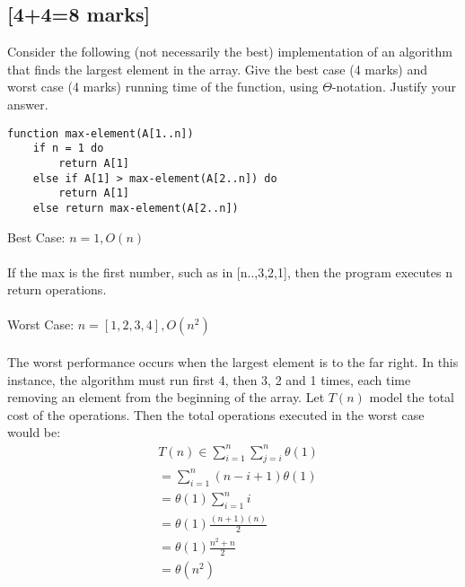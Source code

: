 \documentclass[12pt]{article}
\begin{document}
\subsection{[4+4=8 marks]}
Consider the following (not necessarily the best) implementation of an algorithm that finds the largest element in the array. Give the best case (4 marks)
and worst case (4 marks) running time of the function, using $\Theta$-notation. Justify your answer.
\begin{verbatim}
function max-element(A[1..n])
    if n = 1 do
        return A[1]
    else if A[1] > max-element(A[2..n]) do
        return A[1]
    else return max-element(A[2..n])
\end{verbatim}
Best Case:
$n = 1, O(n)$
\\
\\If the max is the first number, such as in [n..,3,2,1], then the program executes n return operations. 
\\
\\
Worst Case:
$n = [1,2,3,4], O(n^2)$
\\
\\The worst performance occurs when the largest element is to the far right. In this instance, the algorithm must run first 4, then 3, 2 and 1 times, each time removing an element from the beginning of the array. Let $T(n)$ model the total cost of the operations. Then the total operations executed in the worst case would be:\\
\begin{align*}
&T(n) \in \sum_{i=1}^n \sum_{j=i}^n \theta(1)\\
&= \sum_{i=1}^n (n-i+1)\theta(1)\\
&=\theta(1)\sum_{i=1}^n i\\
&=\theta(1)\frac{(n+1)(n)}{2}\\
&=\theta(1)\frac{n^2 + n}{2}\\
&=\theta(n^2)
\end{align*}
\end{document}
